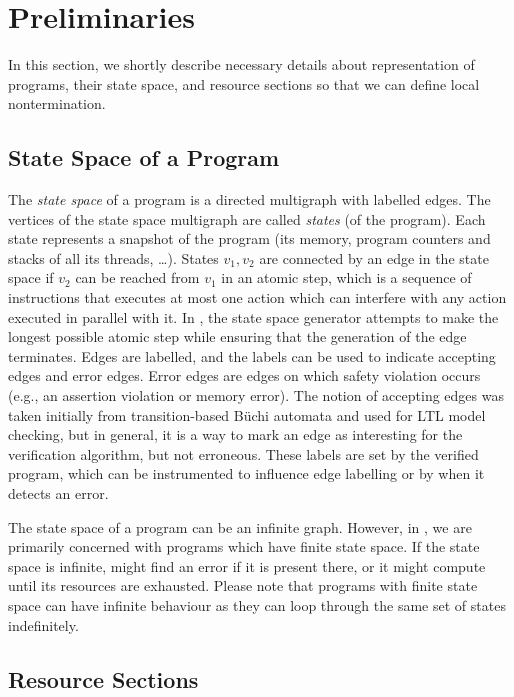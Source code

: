 \section{Preliminaries} \label{sec:prelim}

In this section, we shortly describe necessary details about representation of programs, their state space, and resource sections so that we can define local nontermination.

\subsection{State Space of a Program}

The \emph{state space} of a program is a directed multigraph with labelled edges.
The vertices of the state space multigraph are called \emph{states} (of the program).
Each state represents a snapshot of the program (its memory, program counters and stacks of all its threads, …).
States $v_1, v_2$ are connected by an edge in the state space if $v_2$ can be reached from $v_1$ in an atomic step, which is a sequence of instructions that executes at most one action which can interfere with any action executed in parallel with it.
In \divine, the state space generator attempts to make the longest possible atomic step while ensuring that the generation of the edge terminates.
Edges are labelled, and the labels can be used to indicate accepting edges and error edges.
Error edges are edges on which safety violation occurs (e.g., an assertion violation or memory error).
The notion of accepting edges was taken initially from transition-based Büchi automata and used for LTL model checking, but in general, it is a way to mark an edge as interesting for the verification algorithm, but not erroneous.
These labels are set by the verified program, which can be instrumented to influence edge labelling or by \divine when it detects an error.

The state space of a program can be an infinite graph.
However, in \divine, we are primarily concerned with programs which have finite state space.
If the state space is infinite, \divine might find an error if it is present
there, or it might compute until its resources are exhausted.
Please note that programs with finite state space can have infinite behaviour as they can loop through the same set of states indefinitely.

\subsection{Resource Sections}

